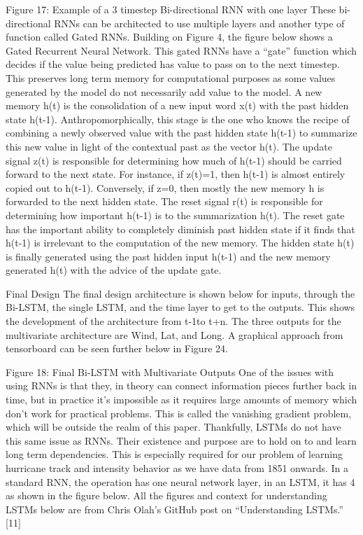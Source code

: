 \documentclass{article}
\begin{document}
Figure 17: Example of a 3 timestep Bi-directional RNN with one layer
These bi-directional RNNs can be architected to use multiple layers and another type of function called Gated RNNs. Building on Figure 4, the figure below shows a Gated Recurrent Neural Network. This gated RNNs have a ``gate'' function which decides if the value being predicted has value to pass on to the next timestep. This preserves long term memory for computational purposes as some values generated by the model do not necessarily add value to the model. A new memory h(t) is the consolidation of a new input word x(t) with the past hidden state h(t-1). Anthropomorphically, this stage is the one who knows the recipe of combining a newly observed value with the past hidden state h(t-1) to summarize this new value in light of the contextual past as the vector h(t). The update signal z(t) is responsible for determining how much of h(t-1) should be carried forward to the next state. For instance, if z(t)=1, then h(t-1) is almost entirely copied out to h(t-1). Conversely, if z=0, then mostly the new memory h is forwarded to the next hidden state. The reset signal r(t) is responsible for determining how important h(t-1) is to the summarization h(t). The reset gate has the important ability to completely diminish past hidden state if it finds that h(t-1) is irrelevant to the computation of the new memory. The hidden state h(t) is finally generated using the past hidden input h(t-1) and the new memory generated h(t) with the advice of the update gate.

Final Design
The final design architecture is shown below for inputs, through the Bi-LSTM, the single LSTM, and the time layer to get to the outputs. This shows the development of the architecture from t-1to t+n. The three outputs for the multivariate architecture are Wind, Lat, and Long. A graphical approach from tensorboard can be seen further below in Figure 24.

Figure 18: Final Bi-LSTM with Multivariate Outputs
One of the issues with using RNNs is that they, in theory can connect information pieces further back in time, but in practice it’s impossible as it requires large amounts of memory which don’t work for practical problems. This is called the vanishing gradient problem, which will be outside the realm of this paper. Thankfully, LSTMs do not have this same issue as RNNs. Their existence and purpose are to hold on to and learn long term dependencies. This is especially required for our problem of learning hurricane track and intensity behavior as we have data from 1851 onwards. In a standard RNN, the operation has one neural network layer, in an LSTM, it has 4 as shown in the figure below. All the figures and context for understanding LSTMs below are from Chris Olah’s GitHub post on ``Understanding LSTMs.''  [11]
\end{document}
